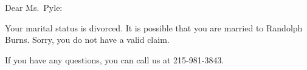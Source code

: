 \documentclass[12pt,letterpaper,]{article}
\newcommand{\myfontfamily}{\rmfamily}
\begin{document}
\RaggedRight

\myfontfamily

\doublespacing

Dear Ms.~Pyle:

Your marital status is divorced. It is possible that you are married to
Randolph Burns. Sorry, you do not have a valid claim.

If you have any questions, you can call us at 215-981-3843.
\end{document}
